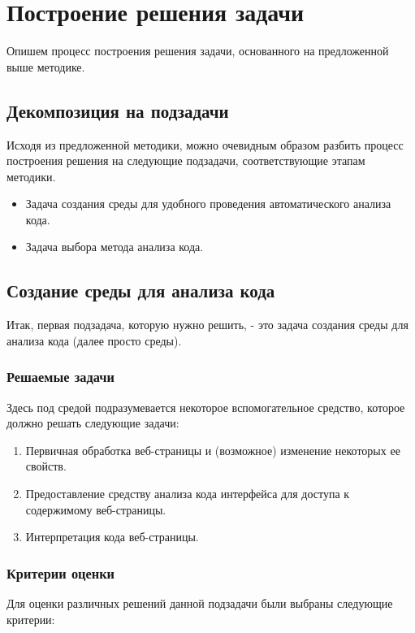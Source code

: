 
\chapter{Построение решения задачи}\label{Solution}
Опишем процесс построения решения задачи, основанного на предложенной выше методике.

\section{Декомпозиция на подзадачи}
Исходя из предложенной методики, можно очевидным образом разбить процесс построения решения на следующие подзадачи, соответствующие этапам методики.

\bigskip
\begin{itemize}
	\item Задача создания среды для удобного проведения автоматического анализа кода.
	\item Задача выбора метода анализа кода.
\end{itemize}

\section{Создание среды для анализа кода}

Итак, первая подзадача, которую нужно решить, - это задача создания среды для анализа кода (далее просто среды).

\subsection{Решаемые задачи}
	Здесь под средой подразумевается некоторое вспомогательное средство, которое должно решать следующие задачи:

	\bigskip
	\begin{enumerate}
		\item Первичная обработка веб-страницы и (возможное) изменение некоторых ее свойств.
		\item Предоставление средству анализа кода интерфейса для доступа к содержимому веб-страницы.
		\item Интерпретация кода веб-страницы.
	\end{enumerate}
	\bigskip

\subsection{Критерии оценки}
	Для оценки различных решений данной подзадачи были выбраны следующие критерии:

